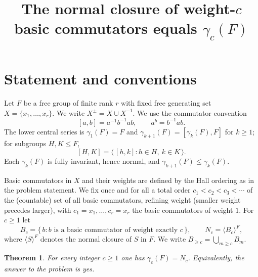 \documentclass{amsart}
\newtheorem{theorem}{Theorem}
\theoremstyle{definition}
\theoremstyle{remark}
\begin{document}
\title{The normal closure of weight-$c$ basic commutators equals $\gamma_c(F)$}
\maketitle

\section{Statement and conventions}

Let $F$ be a free group of finite rank $r$ with fixed free generating set
$X=\{x_1,\dots,x_r\}$. We write $X^{\pm}=X\cup X^{-1}$. We use the commutator
convention
\[
[a,b]=a^{-1}b^{-1}ab ,\qquad a^{b}=b^{-1}ab .
\]
The lower central series is $\gamma_1(F)=F$ and $\gamma_{k+1}(F)=[\gamma_k(F),F]$
for $k\ge 1$; for subgroups $H,K\le F$,
\[
[H,K]=\big\langle\, [h,k] : h\in H,\ k\in K \,\big\rangle .
\]
Each $\gamma_k(F)$ is fully invariant, hence normal, and
$\gamma_{k+1}(F)\le\gamma_k(F)$.

Basic commutators in $X$ and their weights are defined by the Hall ordering as in
the problem statement. We fix once and for all a total order
$c_1<c_2<c_3<\cdots$ of the (countable) set of all basic commutators, refining
weight (smaller weight precedes larger), with $c_1=x_1,\dots,c_r=x_r$ the basic
commutators of weight $1$. For $c\ge 1$ let
\[
B_c=\{\,b : b \text{ is a basic commutator of weight exactly } c\,\},
\qquad
N_c=\langle B_c\rangle^{F},
\]
where $\langle S\rangle^{F}$ denotes the normal closure of $S$ in $F$. We write
$B_{\ge c}=\bigcup_{m\ge c}B_m$.

\begin{theorem}\label{thm:main}
For every integer $c\ge 1$ one has $\gamma_c(F)=N_c$. Equivalently, the answer to
the problem is \emph{yes}.
\end{theorem}
\end{document}
